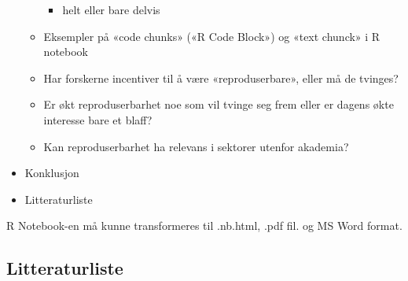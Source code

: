 \documentclass[
  12pt,
  norsk,
]{article}
\providecommand{\tightlist}{%
  \setlength{\itemsep}{0pt}\setlength{\parskip}{0pt}}
\begin{document}
\begin{itemize}
\begin{itemize}
    \begin{itemize}
    \tightlist
    \item
      helt eller bare delvis
    \end{itemize}
  \item
    Eksempler på «code chunks» («R Code Block») og «text chunck» i R
    notebook
  \item
    Har forskerne incentiver til å være «reproduserbare», eller må de
    tvinges?
  \item
    Er økt reproduserbarhet noe som vil tvinge seg frem eller er dagens
    økte interesse bare et blaff?
  \item
    Kan reproduserbarhet ha relevans i sektorer utenfor akademia?
  \end{itemize}
\item
  Konklusjon
\item
  Litteraturliste
\end{itemize}

R Notebook-en må kunne transformeres til .nb.html, .pdf fil. og MS Word
format.

\hypertarget{litteraturliste}{%
\subsection{Litteraturliste}\label{litteraturliste}}
\end{document}
